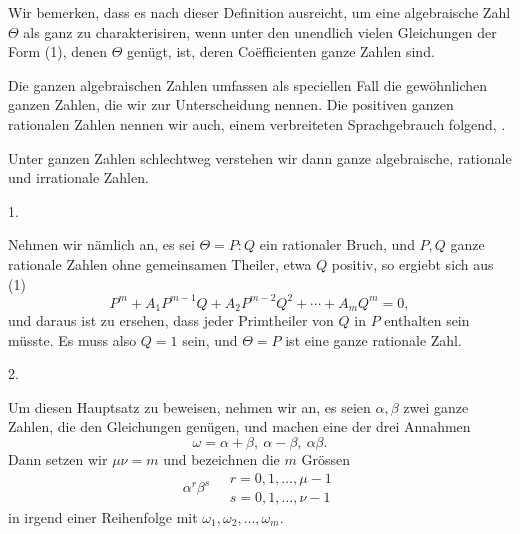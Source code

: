 
Wir bemerken, dass es nach dieser Definition ausreicht, um eine algebraische Zahl $\Theta$ als ganz zu charakterisiren, wenn unter den unendlich vielen Gleichungen der Form (1), denen $\Theta$ gen\"ugt,  ist, deren Co\"efficienten ganze Zahlen sind.

Die ganzen algebraischen Zahlen umfassen als speciellen Fall die gew\"ohnlichen ganzen Zahlen, die wir zur Unterscheidung  nennen. Die positiven ganzen rationalen Zahlen nennen wir auch, einem verbreiteten Sprachgebrauch folgend, .

Unter ganzen Zahlen schlechtweg verstehen wir dann ganze algebraische, rationale und irrationale Zahlen.

1. 

Nehmen wir n\"amlich an, es sei $\Theta = P:Q$ ein rationaler Bruch, und $P, Q$ ganze rationale Zahlen ohne gemeinsamen Theiler, etwa $Q$ positiv, so ergiebt sich aus (1)
\[
P^m + A_1 P^{m-1} Q + A_2 P^{m-2} Q^2 + \cdots + A_m Q^m = 0,
\]
und daraus ist zu ersehen, dass jeder Primtheiler von $Q$ in $P$ enthalten sein m\"usste. Es muss also $Q = 1$ sein, und $\Theta = P$ ist eine ganze rationale Zahl.

2. 

Um diesen Hauptsatz zu beweisen, nehmen wir an, es seien $\alpha, \beta$ zwei ganze Zahlen, die den Gleichungen
gen\"ugen, und machen eine der drei Annahmen
\[
\omega = \alpha + \beta, \ \alpha - \beta, \ \alpha \beta.
\]
Dann setzen wir $\mu \nu = m$ und bezeichnen die $m$ Gr\"ossen
\[
\alpha^r \beta^s \quad \begin{array}{l} r = 0, 1, \ldots, \mu - 1 \\ s = 0, 1, \ldots, \nu - 1 \end{array}
\]
in irgend einer Reihenfolge mit $\omega_1, \omega_2, \ldots, \omega_m$.
